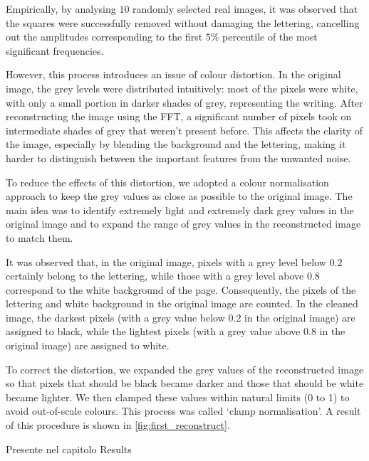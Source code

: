     \noindent Empirically, by analysing $10$ randomly selected real images, it was observed that the squares were successfully removed without damaging the lettering, cancelling out the amplitudes corresponding to the first $5\%$ percentile of the most significant frequencies.

    \noindent However, this process introduces an issue of colour distortion. In the original image, the grey levels were distributed intuitively: most of the pixels were white, with only a small portion in darker shades of grey, representing the writing. After reconstructing the image using the FFT, a significant number of pixels took on intermediate shades of grey that weren't present before. This affects the clarity of the image, especially by blending the background and the lettering, making it harder to distinguish between the important features from the unwanted noise.

	\noindent To reduce the effects of this distortion, we adopted a colour normalisation approach to keep the grey values as close as possible to the original image. The main idea was to identify extremely light and extremely dark grey values in the original image and to expand the range of grey values in the reconstructed image to match them.

    \noindent It was observed that, in the original image, pixels with a grey level below $0.2$ certainly belong to the lettering, while those with a grey level above $0.8$ correspond to the white background of the page. Consequently, the pixels of the lettering and white background in the original image are counted. In the cleaned image, the darkest pixels (with a grey value below $0.2$ in the original image) are assigned to black, while the lightest pixels (with a grey value above $0.8$ in the original image) are assigned to white.

    \noindent To correct the distortion, we expanded the grey values of the reconstructed image so that pixels that should be black became darker and those that should be white became lighter. We then clamped these values within natural limits (0 to 1) to avoid out-of-scale colours. This process was called ‘clamp normalisation’. A result of this procedure is shown in \cref{fig:first_reconstruct}.

    \begin{note} Presente nel capitolo Results \end{note}

